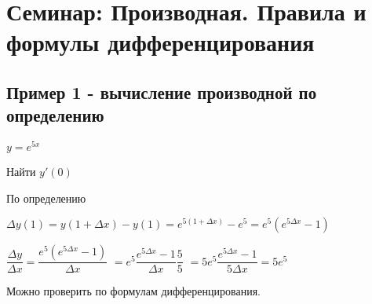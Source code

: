 \section{Семинар: Производная. Правила и формулы дифференцирования}

\subsection{Пример 1 - вычисление производной по определению}

$  y = e^{5x} $

Найти $ y'(0) $

По определению

$ \Delta y(1) = y(1 + \Delta x) - y(1) = e^{5(1 + \Delta x)} - e^{5} = e^{5}( e^{5\Delta x} - 1 )  $

$ \dfrac{\Delta y}{\Delta x} = \dfrac{e^{5}( e^{5\Delta x} - 1 ) }{\Delta x}  $
$ = e^{5} \dfrac{e^{5\Delta x} - 1}{\Delta x} \dfrac{5}{5} $
$ = 5 e^{5} \dfrac{e^{5\Delta x} - 1}{5 \Delta x} = 5 e^{5} $

Можно проверить по формулам дифференцирования.


